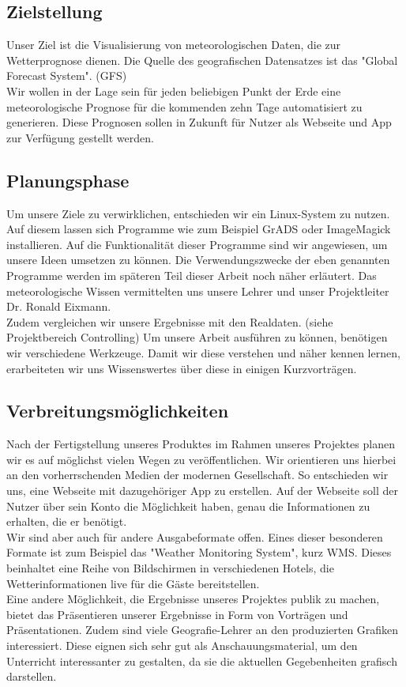 \documentclass[a4paper,oneside,12pt,titlepage]{article}
\begin{document}
    \subsection{Zielstellung}
        Unser Ziel ist die Visualisierung von meteorologischen Daten, die zur Wetterprognose dienen. Die Quelle des geografischen Datensatzes ist das "Global Forecast System". (GFS)\\Wir wollen in der Lage sein für jeden beliebigen Punkt der Erde eine meteorologische Prognose für die kommenden zehn Tage automatisiert zu generieren. Diese Prognosen sollen in Zukunft für Nutzer als Webseite und App zur Verfügung gestellt werden.
    \subsection{Planungsphase}
        Um unsere Ziele zu verwirklichen, entschieden wir ein Linux-System zu nutzen. Auf diesem lassen sich Programme wie zum Beispiel GrADS oder ImageMagick installieren. Auf die Funktionalität dieser Programme sind wir angewiesen, um unsere Ideen umsetzen zu können. Die Verwendungszwecke der eben genannten Programme werden im späteren Teil dieser Arbeit noch näher erläutert. Das meteorologische Wissen vermittelten uns unsere Lehrer und unser Projektleiter Dr. Ronald Eixmann. \\Zudem vergleichen wir unsere Ergebnisse mit den Realdaten. (siehe Projektbereich Controlling) Um unsere Arbeit ausführen zu können, benötigen wir verschiedene Werkzeuge. Damit wir diese verstehen und näher kennen lernen, erarbeiteten wir uns Wissenswertes über diese in einigen Kurzvorträgen.
   
    \subsection{Verbreitungsmöglichkeiten}
        Nach der Fertigstellung unseres Produktes im Rahmen unseres Projektes planen wir es auf möglichst vielen Wegen zu veröffentlichen. Wir orientieren uns hierbei an den vorherrschenden Medien der modernen Gesellschaft. So entschieden wir uns, eine Webseite mit dazugehöriger App zu erstellen. Auf der Webseite soll der Nutzer über sein Konto die Möglichkeit haben, genau die Informationen zu erhalten, die er benötigt. \\Wir sind aber auch für andere Ausgabeformate offen. Eines dieser besonderen Formate ist zum Beispiel das "Weather Monitoring System", kurz WMS. Dieses beinhaltet eine Reihe von Bildschirmen in verschiedenen Hotels, die Wetterinformationen live für die Gäste bereitstellen. \\Eine andere Möglichkeit, die Ergebnisse unseres Projektes publik zu machen, bietet das Präsentieren unserer Ergebnisse in Form von Vorträgen und Präsentationen. Zudem sind viele Geografie-Lehrer an den produzierten Grafiken interessiert. Diese eignen sich sehr gut als Anschauungsmaterial, um den Unterricht interessanter zu gestalten, da sie die aktuellen Gegebenheiten grafisch darstellen. 
\end{document}
